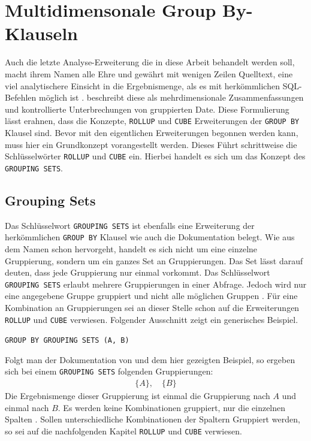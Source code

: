 \section{Multidimensonale Group By-Klauseln}
\label{sec:rollup_and_cube} Auch die letzte Analyse-Erweiterung die in diese
Arbeit behandelt werden soll, macht ihrem Namen alle Ehre und gewährt mit wenigen
Zeilen Quelltext, eine viel analytischere Einsicht in die Ergebnismenge, als es mit
herkömmlichen SQL-Befehlen möglich ist \citep[vgl.][Kapitel 7.2.3]{melton2002advanced}.
\citet[Kapitel 7.2.3]{melton2002advanced} beschreibt diese als mehrdimensionale
Zusammenfassungen und kontrollierte Unterbrechungen von gruppierten Date. Diese Formulierung
lässt erahnen, dass die Konzepte, \texttt{ROLLUP} und \texttt{CUBE} Erweiterungen
der \texttt{GROUP BY} Klausel sind. Bevor mit den eigentlichen Erweiterungen begonnen
werden kann, muss hier ein Grundkonzept vorangestellt werden. Dieses Führt schrittweise
die Schlüsselwörter \texttt{ROLLUP} und \texttt{CUBE} ein. Hierbei handelt es
sich um das Konzept des \texttt{GROUPING SETS}.

\subsection{Grouping Sets}
\label{subsec:grouping_sets} Das Schlüsselwort \texttt{GROUPING SETS} ist
ebenfalls eine Erweiterung der herkömmlichen \texttt{GROUP BY} Klausel wie auch die
\citet{oracle16} Dokumentation belegt. Wie aus dem Namen schon hervorgeht,
handelt es sich nicht um eine einzelne Gruppierung, sondern um ein ganzes Set an
Gruppierungen. Das Set lässt darauf deuten, dass jede Gruppierung nur einmal vorkommt.
Das Schlüsselwort \texttt{GROUPING SETS} erlaubt mehrere Gruppierungen in einer Abfrage.
Jedoch wird nur eine angegebene Gruppe gruppiert und nicht alle möglichen
Gruppen \citep[vgl.][]{oracle16}. Für eine Kombination an Gruppierungen sei an
dieser Stelle schon auf die Erweiterungen \texttt{ROLLUP} und \texttt{CUBE}
verwiesen. Folgender Ausschnitt zeigt ein generisches Beispiel.
\begin{center}
	\texttt{GROUP BY GROUPING SETS (A, B)}
\end{center}
Folgt man der Dokumentation von \citet{oracle16} und dem hier gezeigten Beispiel,
so ergeben sich bei einem \texttt{GROUPING SETS} folgenden Gruppierungen:
\begin{align*}
	\{A\}, \quad \{B\}
\end{align*}
Die Ergebnismenge dieser Gruppierung ist einmal die Gruppierung nach $A$ und
einmal nach $B$. Es werden keine Kombinationen gruppiert, nur die einzelnen
Spalten \citep[vgl.][]{oracle16}. Sollen unterschiedliche Kombinationen der
Spaltern Gruppiert werden, so sei auf die nachfolgenden Kapitel \texttt{ROLLUP}
und \texttt{CUBE} verwiesen.


